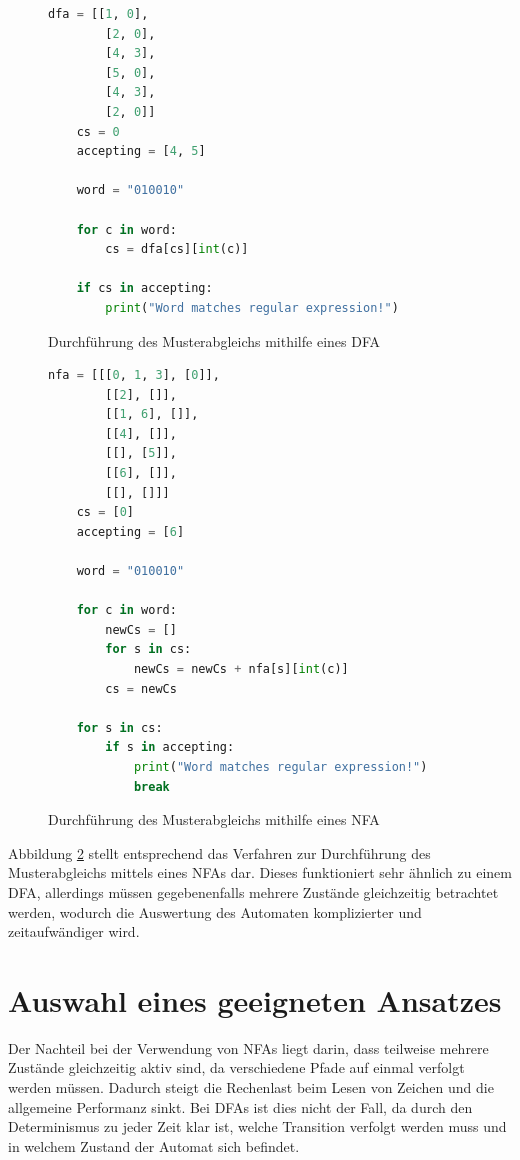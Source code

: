 \begin{figure}[ht]
	\begin{lstlisting}[language=Python]
	dfa = [[1, 0],
		[2, 0],
		[4, 3],
		[5, 0],
		[4, 3],
		[2, 0]]
	cs = 0
	accepting = [4, 5]
	
	word = "010010"
	
	for c in word:
		cs = dfa[cs][int(c)]
	
	if cs in accepting:
		print("Word matches regular expression!")
	\end{lstlisting}
	\caption{Durchführung des Musterabgleichs mithilfe eines DFA}
	\label{dfa_matching}
\end{figure}

\begin{figure}[ht]
	\begin{lstlisting}[language=Python]
	nfa = [[[0, 1, 3], [0]],
		[[2], []],
		[[1, 6], []],
		[[4], []],
		[[], [5]],
		[[6], []],
		[[], []]]
	cs = [0]
	accepting = [6]
	
	word = "010010"
	
	for c in word:
		newCs = []
		for s in cs:
			newCs = newCs + nfa[s][int(c)]
		cs = newCs
	
	for s in cs:
		if s in accepting:
			print("Word matches regular expression!")
			break
	\end{lstlisting}
	\caption{Durchführung des Musterabgleichs mithilfe eines NFA}
	\label{nfa_matching}
\end{figure}

Abbildung \ref{nfa_matching} stellt entsprechend das Verfahren zur Durchführung des Musterabgleichs mittels eines NFAs dar.
Dieses funktioniert sehr ähnlich zu einem DFA, allerdings müssen gegebenenfalls mehrere Zustände gleichzeitig betrachtet werden, wodurch die Auswertung des Automaten komplizierter und zeitaufwändiger wird.

\section{Auswahl eines geeigneten Ansatzes}

Der Nachteil bei der Verwendung von NFAs liegt darin, dass teilweise mehrere Zustände gleichzeitig aktiv sind, da verschiedene Pfade auf einmal verfolgt werden müssen.
Dadurch steigt die Rechenlast beim Lesen von Zeichen und die allgemeine Performanz sinkt.
Bei DFAs ist dies nicht der Fall, da durch den Determinismus zu jeder Zeit klar ist, welche Transition verfolgt werden muss und in welchem Zustand der Automat sich befindet.

